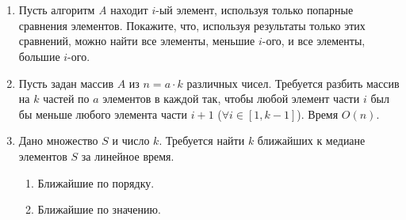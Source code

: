 \section{}

\begin{enumerate}

  \item Пусть алгоритм \textit{A} находит $i$-ый элемент,
	используя только попарные сравнения элементов. Покажите,
	что, используя результаты только этих сравнений, можно
	найти все элементы, меньшие $i$-ого, и все элементы,
	большие $i$-ого.

  \item	Пусть задан массив $A$ из $n = a \cdot k$ различных чисел. 
	Требуется разбить массив на $k$ частей по $a$
	элементов в каждой так, чтобы любой элемент
	части $i$ был бы меньше любого элемента части $i + 1$
	($\forall i \in [1, k - 1]$). Время $O(n)$.

  \item Дано множество $S$ и число $k$. Требуется найти
	$k$ ближайших к медиане элементов $S$ за линейное время.
	\begin{enumerate}
		\item Ближайшие по порядку.
		\item Ближайшие по значению.
	\end{enumerate}


\end{enumerate}



